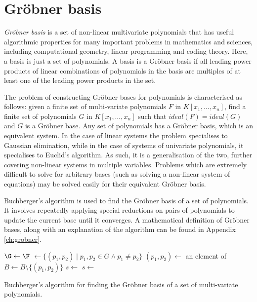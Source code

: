 \section{Gröbner basis}
\label{sec:groebner}
\emph{Gröbner basis} \cite{Groebner} is a set of non-linear multivariate
polynomials that has useful algorithmic properties for many important problems
in mathematics and sciences, including computational geometry, linear programming
and coding theory. Here, a basis is just a set of polynomials. A basis is a Gröbner basis if
all leading power products of linear combinations of polynomials in the basis
are multiples of at least one of the leading power products in the set.

The problem of constructing Gröbner bases for polynomials is characterised as follows:
given a finite set of multi-variate polynomials $F$ in $K[x_1,\dots,x_n]$, find a
finite set of polynomials $G$ in $K[x_1,\dots,x_n]$ such that $ideal(F) = ideal(G)$
and $G$ is a Gröbner base.
Any set of polynomials has a Gröbner basis, which is an equivalent system.
In the case of linear systems the problem specialises to Gaussian elimination,
while in the case of systems of univariate polynomials, it specialises
to Euclid's algorithm. As such, it is a generalisation of the two, further
covering non-linear systems in multiple variables. Problems which are extremely
difficult to solve for arbitrary bases (such as solving a non-linear system of equations)
may be solved easily for their equivalent Gröbner basis.

Buchberger's algorithm \cite{Buchberger} is used to find the Gröbner basis
of a set of polynomials. It involves repeatedly applying special reductions
on pairs of polynomials to update the current base until it converges.
A mathematical definition of Gröbner bases, along with an explanation of
the algorithm can be found in Appendix \ref{ch:grobner}.

\vspace*{.2cm}
\begin{code}
\begin{algorithm}[H]
  $\G \leftarrow \F$\;
  \B $\leftarrow \{(p_1, p_2) \mid p_1,p_2 \in G \land p_1 \neq p_2 \}$\;
  \While{\B $\neq \emptyset$} {
      $(p_1, p_2) \leftarrow$ an element of \B\;
      $B \leftarrow B \setminus \{(p_1, p_2)\}$\;
      $s \leftarrow$ \;
      $s \leftarrow$ \;
  }
  \caption{Buchberger's algorithm for finding the Gröbner basis of a set of multi-variate polynomials.}
\end{algorithm}
\label{alg:buchberger}
\end{code}
\vspace*{.2cm}

